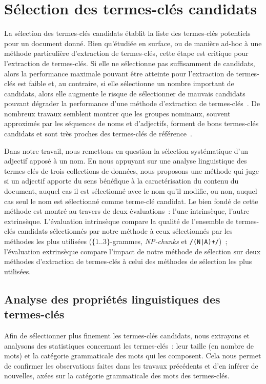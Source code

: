  \section{Sélection des termes-clés candidats}
  \label{sec:main:domain_independent_keyphrase_extraction-keyphrase_candidate_selection}
    La sélection des termes-clés candidats établit la liste des termes-clés
    potentiels pour un document donné. Bien qu'étudiée en surface, ou de manière
    ad-hoc à une méthode particulière d'extraction de termes-clés, cette étape
    est critique pour l'extraction de termes-clés. Si elle ne sélectionne pas
    suffisamment de candidats, alors la performance maximale pouvant être
    atteinte pour l'extraction de termes-clés est faible et, au contraire, si
    elle sélectionne un nombre important de candidats, alors elle augmente le
    risque de sélectionner de mauvais candidats pouvant dégrader la performance
    d'une méthode d'extraction de termes-clés~\cite{hasan2014state_of_the_art}.
    De nombreux travaux semblent montrer que les groupes nominaux, souvent
    approximés par les séquences de noms et d'adjectifs, forment de bons
    termes-clés candidats et sont très proches des termes-clés de
    référence~\cite{barker2000nounphrasehead,hulth2003keywordextraction,wan2008expandrank}.

    Dans notre travail, nous remettons en question la sélection systématique
    d'un adjectif apposé à un nom. En nous appuyant sur une analyse linguistique
    des termes-clés de trois collections de données, nous proposons une méthode
    qui juge si un adjectif apporte du sens bénéfique à la caractérisation du
    contenu du document, auquel cas il est sélectionné avec le nom qu'il
    modifie, ou non, auquel cas seul le nom est sélectionné comme terme-clé
    candidat. Le bien fondé de cette méthode est montré au travers de deux
    évaluations~: l'une intrinsèque, l'autre extrinsèque. L'évaluation
    intrinsèque compare la qualité de l'ensemble de termes-clés candidats
    sélectionnés par notre méthode à ceux sélectionnés par les méthodes les plus
    utilisées ($\{1..3\}$-grammes, \textit{NP-chunks} et \texttt{/(N|A)+/})~;
    l'évaluation extrinsèque compare l'impact de notre méthode de sélection sur
    deux méthodes d'extraction de termes-clés à celui des méthodes de sélection
    les plus utilisées.

    \subsection{Analyse des propriétés linguistiques des termes-clés}
    \label{subsec:main:domain_independent_keyphrase_extraction-keyphrase_candidate_selection-analysis_of_keyphrase_properties}
      Afin de sélectionner plus finement les termes-clés candidats, nous
      extrayons et analysons des statistiques concernant les termes-clés~: leur
      taille (en nombre de mots) et la catégorie grammaticale des mots qui les
      composent. Cela nous permet de confirmer les observations faites dans les
      travaux précédents et d'en inférer de nouvelles, axées sur la catégorie
      grammaticale des mots des termes-clés.

